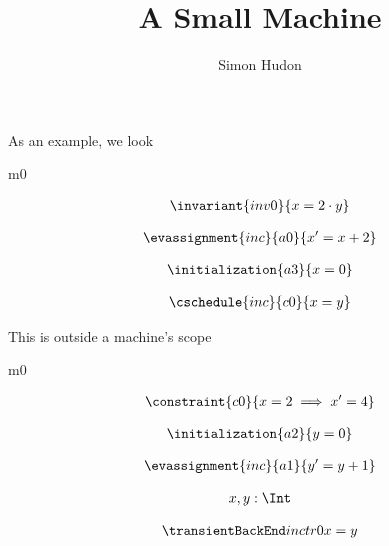 \documentclass[12pt]{amsart}
\title{A Small Machine}
\author{Simon Hudon}
\date{} %
\begin{document}
\maketitle

As an example, we look

\begin{machine}{m0}



\begin{align*}
\invariant{inv0}
{	x = 2 \cdot y	}
\end{align*}

\begin{align*}
\evassignment{inc}{a0}
{	x' = x + 2	}
\end{align*}

\begin{align*}
\initialization{a3}
{	x = 0	}
\end{align*}


\begin{align*}
\cschedule{inc}{c0}
{	x = y	}
\end{align*}

\end{machine}

This is outside a machine's scope

\begin{machine}{m0}

\begin{align*}
\constraint{c0}
{	x = 2 \implies x' = 4	}
\end{align*}

\begin{align*}
\initialization{a2}
{	y = 0	}
\end{align*}

\begin{align*}
\evassignment{inc}{a1}
{	y' = y + 1	}
\end{align*}

\begin{align*}
\variable{	x,y: \Int}
\end{align*}

\begin{align*}
\transient{inc}{tr0}
{	x = y	}
\end{align*}


\end{machine}
\end{document}
